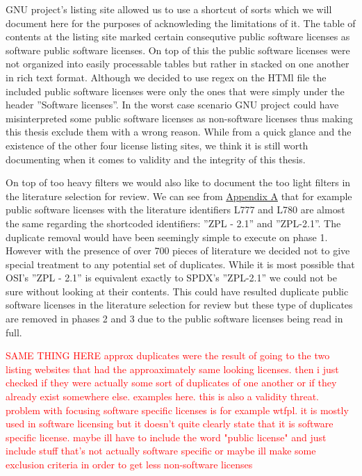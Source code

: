 GNU project's listing site allowed us to use a shortcut of sorts which we will document here for the purposes of acknowleding the limitations of it. The table of contents at the listing site marked certain consequtive public software licenses as software public software licenses. On top of this the public software licenses were not organized into easily processable tables but rather in stacked on one another in rich text format. Although we decided to use regex on the HTMl file the included public software licenses were only the ones that were simply under the header ''Software licenses''. In the worst case scenario GNU project could have misinterpreted some public software licenses as non-software licenses thus making this thesis exclude them with a wrong reason. While from a quick glance and the existence of the other four license listing sites, we think it is still worth documenting when it comes to validity and the integrity of this thesis.

On top of too heavy filters we would also like to document the too light filters in the literature selection for review. We can see from \hyperref[appendix:a]{Appendix A} that for example public software licenses with the literature identifiers L777 and L780 are almost the same regarding the shortcoded identifiers: ''ZPL - 2.1'' and ''ZPL-2.1''. The duplicate removal would have been seemingly simple to execute on phase 1. However with the presence of over 700 pieces of literature we decided not to give special treatment to any potential set of duplicates. While it is most possible that OSI's ''ZPL - 2.1'' is equivalent exactly to SPDX's ''ZPL-2.1'' we could not be sure without looking at their contents. This could have resulted duplicate public software licenses in the literature selection for review but these type of duplicates are removed in phases 2 and 3 due to the public software licenses being read in full.

\textcolor{red}{SAME THING HERE approx duplicates were the result of going to the two listing websites that had the approaximately same looking licenses. then i just checked if they were actually some sort of duplicates of one another or if they already exist somewhere else. examples here. this is also a validity threat. problem with focusing software specific licenses is for example wtfpl. it is mostly used in software licensing but it doesn't quite clearly state that it is software specific license. maybe ill have to include the word "public license" and just include stuff that's not actually software specific or maybe ill make some exclusion criteria in order to get less non-software licenses}

